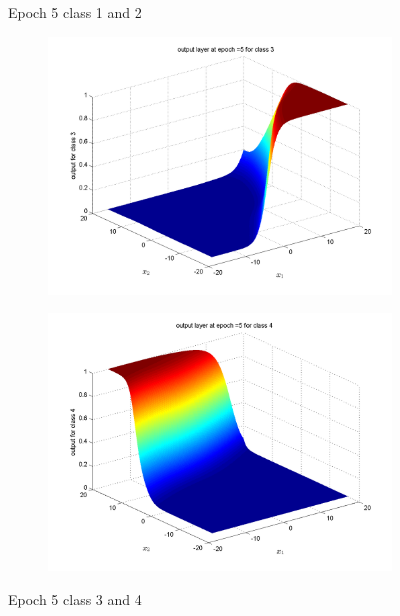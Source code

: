 \documentclass{article}
\begin{document}
\begin{flushleft}
\begin{figure}
\begin{subfigure}{.5\textwidth}
\end{subfigure}
\caption{Epoch 5 class 1 and 2}
\end{figure}

\begin{figure}
\begin{subfigure}{.5\textwidth}
  \centering
  \includegraphics[width=.8\linewidth]{Classification/linearlySeparable/5_3}
 
\end{subfigure}%
\begin{subfigure}{.5\textwidth}
  \centering
  \includegraphics[width=.8\linewidth]{Classification/linearlySeparable/5_4}
  
\end{subfigure}
\caption{Epoch 5 class 3 and 4}
\end{figure}



\end{flushleft}
\end{document}
